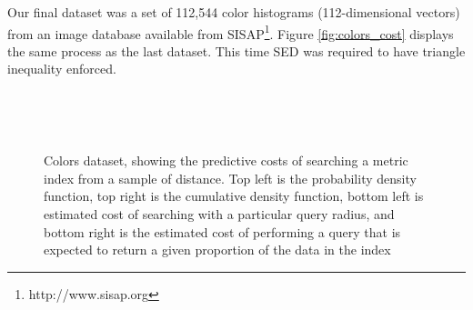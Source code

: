 Our final dataset was a set of 112,544 color histograms (112-dimensional vectors) from an image database available from SISAP\footnote{http://www.sisap.org}.  Figure \ref{fig:colors_cost} displays the same process as the last dataset.  This time SED was required to have triangle inequality enforced.
\begin{figure}
        \centering
        ~ 
        
         
        ~ 
\caption[Metric Search Cost -- Colors dataset]{Colors dataset, showing the predictive costs of searching a metric index from a sample of distance.  Top left is the probability density function, top right is the cumulative density function, bottom left is estimated cost of searching with a particular query radius, and bottom right is the estimated cost of performing a query that is expected to return a given proportion of the data in the index}
\end{figure}
